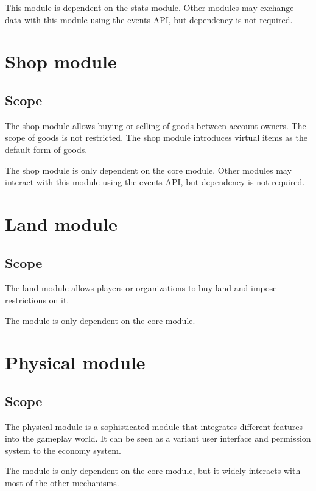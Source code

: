 \documentclass{report}
\begin{document}
			This module is dependent on the stats module.
			Other modules may exchange data with this module using the events API,
			but dependency is not required.

	\part{Shop module}
		\chapter{Scope}
			The shop module allows buying or selling of goods between account owners.
			The scope of goods is not restricted.
			The shop module introduces virtual items as the default form of goods.

			The shop module is only dependent on the core module.
			Other modules may interact with this module using the events API,
			but dependency is not required.

	\part{Land module}
		\chapter{Scope}
			The land module allows players or organizations to buy land and impose restrictions on it.

			The module is only dependent on the core module.

	\part{Physical module}
		\chapter{Scope}
			The physical module is a sophisticated module that integrates different features into the gameplay world.
			It can be seen as a variant user interface and permission system to the economy system.

			The module is only dependent on the core module, but it widely interacts with most of the other mechanisms.
\end{document}
